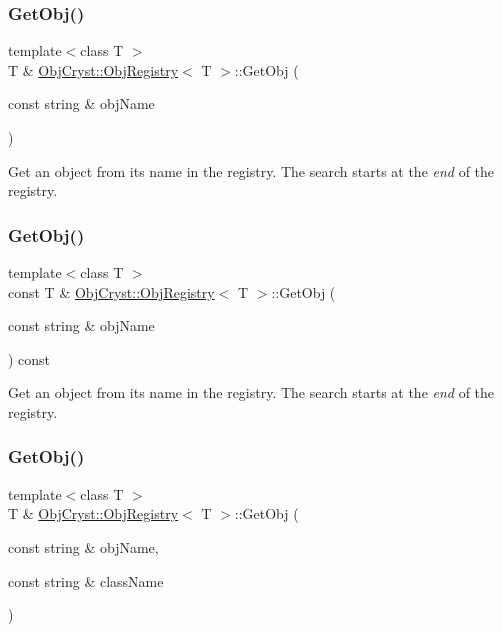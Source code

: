 \subsubsection{\texorpdfstring{GetObj()}{GetObj()}\hspace{0.1cm}{\footnotesize\ttfamily [3/6]}}
{\footnotesize\ttfamily template$<$class T $>$ \\
T \& \mbox{\hyperlink{class_obj_cryst_1_1_obj_registry}{Obj\+Cryst\+::\+Obj\+Registry}}$<$ T $>$\+::Get\+Obj (\begin{DoxyParamCaption}\item[{const string \&}]{obj\+Name }\end{DoxyParamCaption})}

Get an object from its name in the registry. The search starts at the {\itshape end} of the registry. \mbox{\label{class_obj_cryst_1_1_obj_registry_a56ca93ab655b513d91cd9b7829cbea0c}} 
\subsubsection{\texorpdfstring{GetObj()}{GetObj()}\hspace{0.1cm}{\footnotesize\ttfamily [4/6]}}
{\footnotesize\ttfamily template$<$class T $>$ \\
const T \& \mbox{\hyperlink{class_obj_cryst_1_1_obj_registry}{Obj\+Cryst\+::\+Obj\+Registry}}$<$ T $>$\+::Get\+Obj (\begin{DoxyParamCaption}\item[{const string \&}]{obj\+Name }\end{DoxyParamCaption}) const}

Get an object from its name in the registry. The search starts at the {\itshape end} of the registry. \mbox{\label{class_obj_cryst_1_1_obj_registry_ad1971c0ea162546bf8322dc61764fd32}} 
\subsubsection{\texorpdfstring{GetObj()}{GetObj()}\hspace{0.1cm}{\footnotesize\ttfamily [5/6]}}
{\footnotesize\ttfamily template$<$class T $>$ \\
T \& \mbox{\hyperlink{class_obj_cryst_1_1_obj_registry}{Obj\+Cryst\+::\+Obj\+Registry}}$<$ T $>$\+::Get\+Obj (\begin{DoxyParamCaption}\item[{const string \&}]{obj\+Name,  }\item[{const string \&}]{class\+Name }\end{DoxyParamCaption})}

